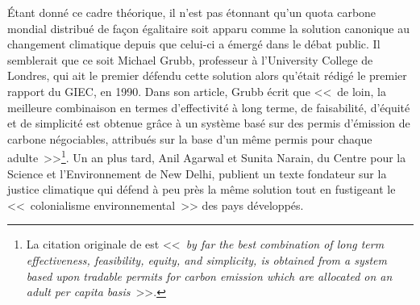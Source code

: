 \documentclass[a5paper,french,openany]{memoir}
\begin{document}
Étant donné ce cadre théorique, il n'est pas étonnant qu'un quota carbone mondial distribué de façon égalitaire soit apparu comme la solution canonique au changement climatique depuis que celui-ci a émergé dans le débat public. Il semblerait que ce soit Michael Grubb, professeur à l'University College de Londres, qui ait le premier défendu cette solution alors qu'était rédigé le premier rapport du GIEC, en 1990. Dans son article, Grubb écrit que <<~de loin, la meilleure combinaison en termes d'effectivité à long terme, de faisabilité, d'équité et de simplicité est obtenue grâce à un système basé sur des permis d'émission de carbone négociables, attribués sur la base d'un même permis pour chaque adulte~>>\footnote{La citation originale de \citet{grubb_greenhouse_1990} est <<~\textit{by far the best combination of long term effectiveness, feasibility, equity, and simplicity, is obtained from a system based upon tradable permits for carbon emission which are allocated on an adult per capita basis}~>>.}. Un an plus tard, Anil Agarwal et Sunita Narain, du Centre pour la Science et l'Environnement de New Delhi, publient un texte fondateur sur la justice climatique qui défend à peu près la même solution tout en fustigeant le <<~colonialisme environnemental~>> des pays développés. %
\end{document}
